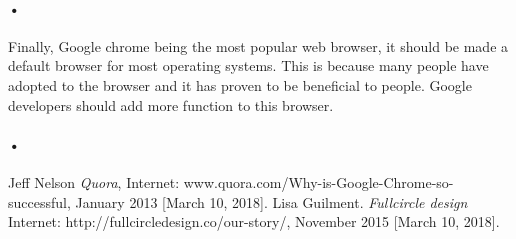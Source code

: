 \documentclass[7pt]{article}
\begin{document}
\paragraph{•}
Finally, Google chrome being the most popular web browser, it should be made a default browser for most operating systems. This is because many people have adopted to the browser and it has proven to be beneficial to people. Google developers should add more function to this browser.  


  

\paragraph{•} 

\begin{thebibliography}{9}
 Jeff Nelson \textit{Quora}, 
Internet: www.quora.com/Why-is-Google-Chrome-so-successful, January 2013 [March 10, 2018].
 Lisa  Guilment. \textit{Fullcircle design} 
Internet: http://fullcircledesign.co/our-story/, November 2015 [March 10, 2018].

\end{thebibliography}
\end{document}
